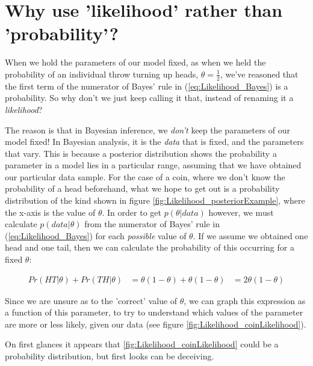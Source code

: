 \documentclass[11pt,fullpage]{book}
\begin{document}
\section{Why use 'likelihood' rather than 'probability'?}
When we hold the parameters of our model fixed, as when we held the probability of an individual throw turning up heads, $\theta=\frac{1}{2}$, we've reasoned that the first term of the numerator of Bayes' rule in (\ref{eq:Likelihood_Bayes}) is a probability. So why don't we just keep calling it that, instead of renaming it a \textit{likelihood}? 

The reason is that in Bayesian inference, we \textit{don't} keep the parameters of our model fixed! In Bayesian analysis, it is the \textit{data} that is fixed, and the parameters that vary. This is because a posterior distribution shows the probability a parameter in a model lies in a particular range, assuming that we have obtained our particular data sample. For the case of a coin, where we don't know the probability of a head beforehand, what we hope to get out is a probability distribution of the kind shown in figure \ref{fig:Likelihood_posteriorExample}, where the x-axis is the value of $\theta$. In order to get $p(\theta|data)$ however, we must calculate $p(data|\theta)$ from the numerator of Bayes' rule in (\ref{eq:Likelihood_Bayes}) for each \textit{possible} value of $\theta$. If we assume we obtained one head and one tail, then we can calculate the probability of this occurring for a fixed $\theta$:

\begin{equation}
\begin{align}
Pr(HT|\theta) + Pr(TH|\theta) &= \theta(1-\theta) + \theta(1-\theta)
&= 2\theta(1-\theta)
\end{align}
\end{equation}

Since we are unsure as to the 'correct' value of $\theta$, we can graph this expression as a function of this parameter, to try to understand which values of the parameter are more or less likely, given our data (see figure \ref{fig:Likelihood_coinLikelihood}).

On first glances it appears that \ref{fig:Likelihood_coinLikelihood} could be a probability distribution, but first looks can be deceiving. 
\end{document}
